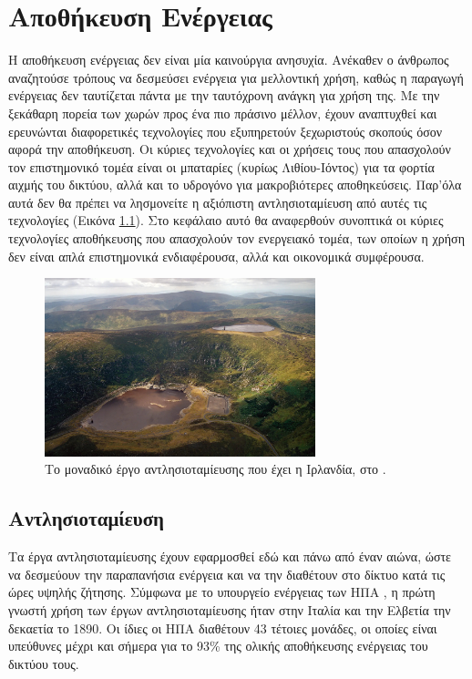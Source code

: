 \documentclass[12pt]{report}
\begin{document}
\chapter{Αποθήκευση Ενέργειας}
\label{chap:storage}
Η αποθήκευση ενέργειας δεν είναι μία καινούργια ανησυχία. Ανέκαθεν ο άνθρωπος αναζητούσε τρόπους να δεσμεύσει ενέργεια για μελλοντική χρήση, καθώς η παραγωγή ενέργειας δεν ταυτίζεται πάντα με την ταυτόχρονη ανάγκη για χρήση της. 
Με την ξεκάθαρη πορεία των χωρών προς ένα πιο πράσινο μέλλον, έχουν αναπτυχθεί και ερευνώνται διαφορετικές τεχνολογίες που εξυπηρετούν ξεχωριστούς σκοπούς όσον αφορά την αποθήκευση. 
Οι κύριες τεχνολογίες και οι χρήσεις τους που απασχολούν τον επιστημονικό τομέα
είναι οι μπαταρίες (κυρίως Λιθίου-Ιόντος) για τα φορτία αιχμής του δικτύου, αλλά και το υδρογόνο για μακροβιότερες αποθηκεύσεις. Παρ'όλα αυτά δεν θα πρέπει να λησμονείτε η αξιόπιστη αντλησιοταμίευση από αυτές τις τεχνολογίες 
(Εικόνα \ref{fig:turlough-hill}). 
Στο κεφάλαιο αυτό θα αναφερθούν συνοπτικά οι κύριες τεχνολογίες αποθήκευσης που απασχολούν τον ενεργειακό τομέα, των οποίων η χρήση δεν είναι απλά επιστημονικά ενδιαφέρουσα, αλλά και οικονομικά συμφέρουσα.

\begin{figure}[h]
				\center
				\includegraphics[width=0.7\textwidth]{turlough-hill}
				\captionsetup{name=Εικόνα, width=0.8\textwidth}
				\caption{Το μοναδικό έργο αντλησιοταμίευσης που έχει η Ιρλανδία, στο {}.}
				\label{fig:turlough-hill}
\end{figure}
\pagebreak

\section{Αντλησιοταμίευση}
Τα έργα αντλησιοταμίευσης έχουν εφαρμοσθεί εδώ και πάνω από έναν αιώνα, ώστε να δεσμεύουν την παραπανήσια ενέργεια και να την διαθέτουν στο δίκτυο κατά τις ώρες υψηλής ζήτησης. 
Σύμφωνα με το υπουργείο ενέργειας των ΗΠΑ \parencite{energygov1801}, η πρώτη γνωστή χρήση των έργων αντλησιοταμίευσης ήταν στην Ιταλία και την Ελβετία την δεκαετία το 1890. Οι ίδιες οι ΗΠΑ διαθέτουν 43 τέτοιες μονάδες, οι
οποίες είναι υπεύθυνες μέχρι και σήμερα για το 93\% της ολικής αποθήκευσης ενέργειας του δικτύου τους. 
\end{document}
